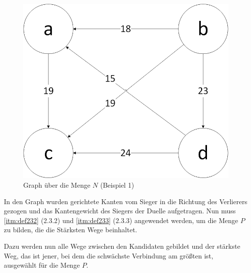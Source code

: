 \begin{figure}[!h]
\centering
\includegraphics[scale=0.5]{Bilder/Beispiel1_Graph.png}
\caption{Graph über die Menge $N$ (Beispiel 1)}
\label{fig:graph1}
\end{figure}

In den Graph wurden gerichtete Kanten vom Sieger in die Richtung des Verlierers gezogen und das Kantengewicht des Siegers der Duelle aufgetragen. Nun muss \ref{itm:def232} (2.3.2) und \ref{itm:def233} (2.3.3) angewendet werden, um die Menge $P$ zu bilden, die die Stärksten Wege beinhaltet.

Dazu werden nun alle Wege zwischen den Kandidaten gebildet und der stärkste Weg, das ist jener, bei dem die schwächste Verbindung am größten ist, ausgewählt für die Menge $P$.

